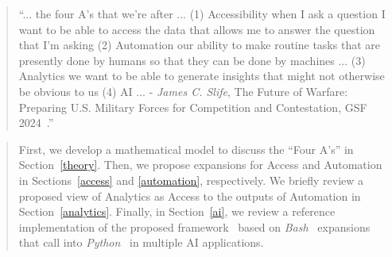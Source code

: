 \begin{quote}
\enquote{... the four A's that we're after ... (1) Accessibility when I ask a question I want to be able to access the data that allows me to answer the question that I'm asking (2) Automation our ability to make routine tasks that are presently done by humans so that they can be done by machines ... (3) Analytics we want to be able to generate insights that might not otherwise be obvious to us (4) AI ... - \emph{James C. Slife}, The Future of Warfare: Preparing U.S. Military Forces for Competition and Contestation, GSF 2024~\cite{Slife24}.}
\end{quote}


\begin{abstract}
First, we develop a mathematical model to discuss the ``Four A's'' in Section~\ref{theory}. Then, we propose expansions for Access and Automation in Sections~\ref{access} and \ref{automation}, respectively. We briefly review a proposed view of Analytics as Access to the outputs of Automation in Section~\ref{analytics}. Finally, in Section~\ref{ai}, we review a reference implementation of the proposed framework~\cite{abcli} based on \emph{Bash}~\cite{gnu_bash} expansions that call into \emph{Python}~\cite{python} in multiple AI applications.
\end{abstract}



